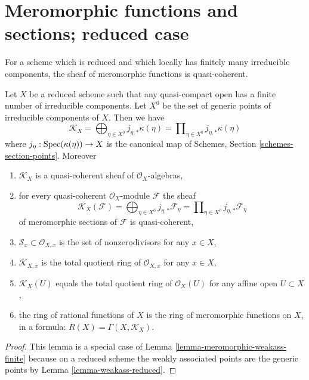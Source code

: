 \section{Meromorphic functions and sections; reduced case}
\label{section-meromorphic-reduced}

\noindent
For a scheme which is reduced and which locally has finitely many irreducible
components, the sheaf of meromorphic functions is quasi-coherent.

\begin{lemma}
\label{lemma-reduced-finite-irreducible}
Let $X$ be a reduced scheme such that any quasi-compact open
has a finite number of irreducible components. Let $X^0$ be the set
of generic points of irreducible components of $X$. Then we have
$$
\mathcal{K}_X =
\bigoplus\nolimits_{\eta \in X^0} j_{\eta, *}\kappa(\eta) =
\prod\nolimits_{\eta \in X^0} j_{\eta, *}\kappa(\eta)
$$
where $j_\eta : \mathop{\mathrm{Spec}}(\kappa(\eta)) \to X$ is the canonical map
of Schemes, Section \ref{schemes-section-points}. Moreover
\begin{enumerate}
\item $\mathcal{K}_X$ is a quasi-coherent sheaf of
$\mathcal{O}_X$-algebras,
\item for every quasi-coherent $\mathcal{O}_X$-module $\mathcal{F}$ the sheaf
$$
\mathcal{K}_X(\mathcal{F}) =
\bigoplus\nolimits_{\eta \in X^0} j_{\eta, *}\mathcal{F}_\eta =
\prod\nolimits_{\eta \in X^0} j_{\eta, *}\mathcal{F}_\eta
$$
of meromorphic sections of $\mathcal{F}$
is quasi-coherent,
\item $\mathcal{S}_x \subset \mathcal{O}_{X, x}$
is the set of nonzerodivisors for any $x \in X$,
\item $\mathcal{K}_{X, x}$ is the total quotient ring of $\mathcal{O}_{X, x}$
for any $x \in X$,
\item $\mathcal{K}_X(U)$ equals the total quotient ring of $\mathcal{O}_X(U)$
for any affine open $U \subset X$,
\item the ring of rational functions of $X$ is the ring of meromorphic
functions on $X$, in a formula: $R(X) = \Gamma(X, \mathcal{K}_X)$.
\end{enumerate}
\end{lemma}

\begin{proof}
This lemma is a special case of
Lemma \ref{lemma-meromorphic-weakass-finite}
because on a reduced scheme the weakly associated
points are the generic points by
Lemma \ref{lemma-weakass-reduced}.
\end{proof}

